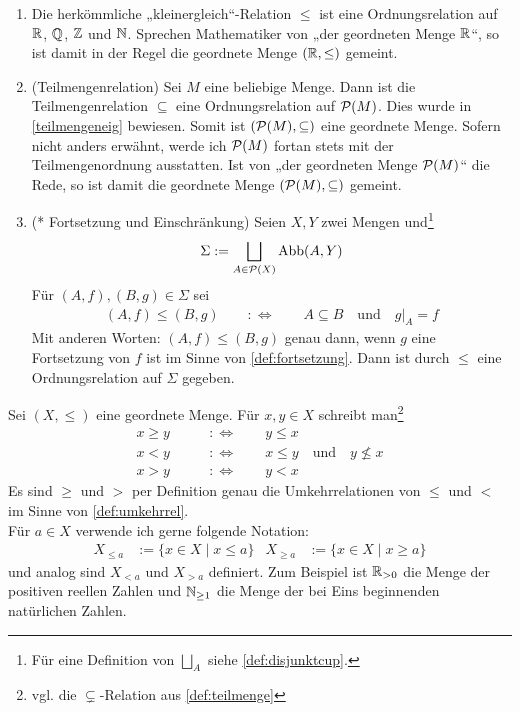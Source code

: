 \begin{bsp} \quad
    \begin{enumerate}
        \item Die herkömmliche „kleinergleich“-Relation $\le$ ist eine Ordnungsrelation auf $\mathbb R$, $\mathbb Q$, $\mathbb Z$ und $\mathbb N$. Sprechen Mathematiker von „der geordneten Menge $\mathbb R$“, so ist damit in der Regel die geordnete Menge $(\mathbb R,\le)$ gemeint.
        \item(Teilmengenrelation) Sei $M$ eine beliebige Menge. Dann ist die Teilmengenrelation $\subseteq$ eine Ordnungsrelation auf $\mathcal P(M)$. Dies wurde in \cref{teilmengeneig} bewiesen. Somit ist $(\mathcal P(M),\subseteq)$ eine geordnete Menge. Sofern nicht anders erwähnt, werde ich $\mathcal P(M)$ fortan stets mit der Teilmengenordnung ausstatten. Ist von „der geordneten Menge $\mathcal P(M)$“ die Rede, so ist damit die geordnete Menge $(\mathcal P(M),\subseteq)$ gemeint.
        \item(* Fortsetzung und Einschränkung) Seien $X,Y$ zwei Mengen und\footnote{Für eine Definition von $\bigsqcup_A$ siehe \cref{def:disjunktcup}.}
            \[ \Sigma := \bigsqcup_{A\in \mathcal P(X)} \operatorname{Abb}(A,Y) \]
        Für $(A,f),(B,g)\in\Sigma$ sei
        \begin{align*}
            (A,f) \le (B,g) \qquad:\Leftrightarrow\qquad A\subseteq B\quad \text{und}\quad g\vert_A=f
        \end{align*}
        Mit anderen Worten: $(A,f)\le (B,g)$ genau dann, wenn $g$ eine Fortsetzung von $f$ ist im Sinne von \cref{def:fortsetzung}. Dann ist durch $\le$ eine Ordnungsrelation auf $\Sigma$ gegeben.
    \end{enumerate}
\end{bsp}


\begin{nota} \label{striktkleiner}
    Sei $(X,\le)$ eine geordnete Menge. Für $x,y\in X$ schreibt man\footnote{vgl. die $\subsetneq$-Relation aus \cref{def:teilmenge}}
    \begin{align*}
        x \ge y \qquad &:\Leftrightarrow\qquad y \le x \\
        x < y \qquad &:\Leftrightarrow\qquad x\le y\quad \text{und}\quad y \not \le x \\
        x > y \qquad &:\Leftrightarrow\qquad y < x
    \end{align*}
    Es sind $\ge$ und $>$ per Definition genau die Umkehrrelationen von $\le$ und $<$ im Sinne von \cref{def:umkehrrel}. \\[0.5em]
    Für $a\in X$ verwende ich gerne folgende Notation:
    \begin{align*}
        X_{\le a} & := \{x\in X\mid x\le a\} & X_{\ge a} & := \{x\in X\mid x\ge a\}
    \end{align*}
    und analog sind $X_{<a}$ und $X_{>a}$ definiert. Zum Beispiel ist $\mathbb R_{>0}$ die Menge der positiven reellen Zahlen und $\mathbb N_{\ge 1}$ die Menge der bei Eins beginnenden natürlichen Zahlen.
\end{nota}


